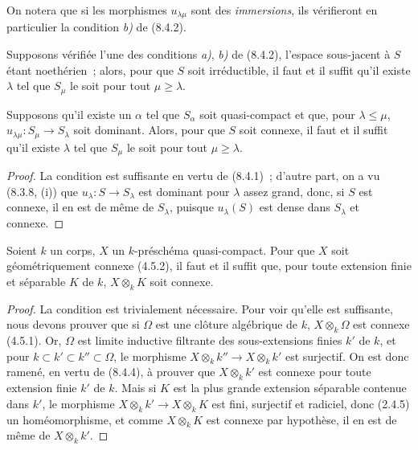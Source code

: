 On notera que si les morphismes $u_{\lambda\mu}$ sont des \emph{immersions},
ils vérifieront en particulier la condition \emph{b)} de (8.4.2).

\begin{corollary}[8.4.3]
\label{IV.8.4.3-fr}
Supposons vérifiée l'une des conditions \emph{a)}, \emph{b)} de \textup{(8.4.2)},
l'espace sous-jacent à $S$ étant noethérien~; alors, pour que $S$ soit
irréductible, il faut et il suffit qu'il existe $\lambda$ tel que $S_\mu$ le
soit pour tout $\mu\geq\lambda$.
\end{corollary}

\begin{proposition}[8.4.4]
\label{IV.8.4.4-fr}
Supposons qu'il existe un $\alpha$ tel que $S_\alpha$ soit quasi-compact et
que, pour $\lambda\leq\mu$, $u_{\lambda\mu}:S_\mu\to S_\lambda$ soit dominant.
Alors, pour que $S$ soit connexe, il faut et il suffit qu'il existe $\lambda$
tel que $S_\mu$ le soit pour tout $\mu\geq\lambda$.
\end{proposition}

\begin{proof}
La condition est suffisante en vertu de (8.4.1)~; d'autre part, on a vu
(8.3.8, (i)) que $u_\lambda:S\to S_\lambda$ est dominant pour $\lambda$ assez
grand, donc, si $S$ est connexe, il en est de même de $S_\lambda$, puisque
$u_\lambda(S)$ est dense dans $S_\lambda$ et connexe.
\end{proof}

\begin{corollary}[8.4.5]
\label{IV.8.4.5-fr}
Soient $k$ un corps, $X$ un $k$-préschéma quasi-compact. Pour que $X$ soit
géométriquement connexe \textup{(4.5.2)}, il faut et il suffit que, pour toute extension
finie et séparable $K$ de $k$, $X\otimes_k K$ soit connexe.
\end{corollary}

\begin{proof}
La condition est trivialement nécessaire. Pour voir qu'elle est suffisante,
nous devons prouver que si $\Omega$ est une clôture algébrique de $k$,
$X\otimes_k\Omega$ est connexe (4.5.1). Or, $\Omega$ est limite inductive
filtrante des sous-extensions finies $k'$ de $k$, et pour
$k\subset k'\subset k''\subset\Omega$, le morphisme
$X\otimes_k k''\to X\otimes_k k'$ est surjectif. On est donc ramené, en vertu
de (8.4.4), à prouver que $X\otimes_k k'$ est connexe pour toute extension
finie $k'$ de $k$. Mais si $K$ est la plus grande extension séparable contenue
dans $k'$, le morphisme $X\otimes_k k'\to X\otimes_k K$ est fini, surjectif et
radiciel, donc (2.4.5) un homéomorphisme, et comme $X\otimes_k K$ est connexe
par hypothèse, il en est de même de $X\otimes_k k'$.
\end{proof}

